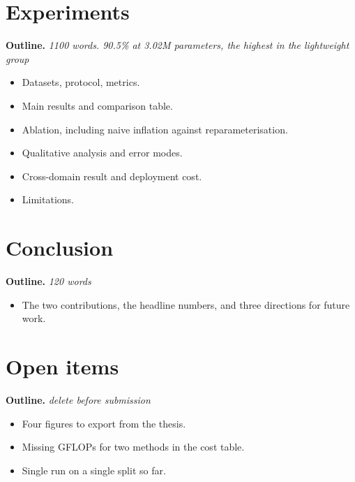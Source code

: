 \documentclass[conference]{IEEEtran}
\newenvironment{outline}[1]
  {\par\medskip\noindent\color{outlinegray}\small
   \textbf{Outline.} \textit{#1}\begin{itemize}\setlength{\itemsep}{2pt}}
  {\end{itemize}\par\medskip}
\begin{document}
\section{Experiments}
\label{sec:exp}

\begin{outline}{1100 words. 90.5\% at 3.02M parameters, the highest in the lightweight group}
  \item Datasets, protocol, metrics.
  \item Main results and comparison table.
  \item Ablation, including naive inflation against reparameterisation.
  \item Qualitative analysis and error modes.
  \item Cross-domain result and deployment cost.
  \item Limitations.
\end{outline}

\section{Conclusion}
\label{sec:conclusion}

\begin{outline}{120 words}
  \item The two contributions, the headline numbers, and three
        directions for future work.
\end{outline}

\section*{Open items}

\begin{outline}{delete before submission}
  \item Four figures to export from the thesis.
  \item Missing GFLOPs for two methods in the cost table.
  \item Single run on a single split so far.
\end{outline}



\end{document}
